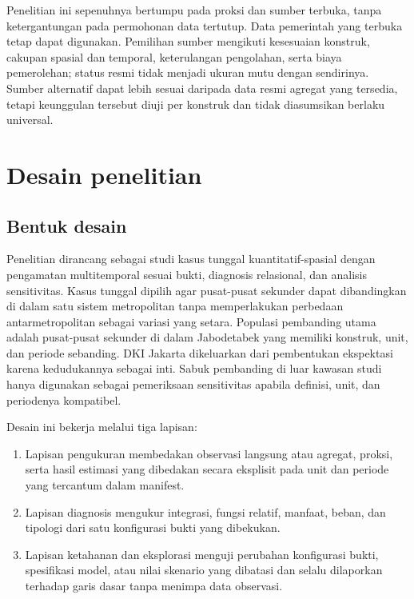 \documentclass[11pt,a4paper,oneside,openany,indonesian]{report}
\begin{document}
Penelitian ini sepenuhnya bertumpu pada proksi dan sumber terbuka, tanpa
ketergantungan pada permohonan data tertutup. Data pemerintah yang
terbuka tetap dapat digunakan. Pemilihan sumber mengikuti kesesuaian
konstruk, cakupan spasial dan temporal, keterulangan pengolahan, serta
biaya pemerolehan; status resmi tidak menjadi ukuran mutu dengan
sendirinya. Sumber alternatif dapat lebih sesuai daripada data resmi
agregat yang tersedia, tetapi keunggulan tersebut diuji per konstruk dan
tidak diasumsikan berlaku universal.

\section{Desain penelitian}\label{desain-penelitian}

\subsection{Bentuk desain}\label{bentuk-desain}

Penelitian dirancang sebagai studi kasus tunggal kuantitatif-spasial
dengan pengamatan multitemporal sesuai bukti, diagnosis relasional, dan
analisis sensitivitas. Kasus tunggal dipilih agar pusat-pusat sekunder
dapat dibandingkan di dalam satu sistem metropolitan tanpa memperlakukan
perbedaan antarmetropolitan sebagai variasi yang setara. Populasi
pembanding utama adalah pusat-pusat sekunder di dalam Jabodetabek yang
memiliki konstruk, unit, dan periode sebanding. DKI Jakarta dikeluarkan
dari pembentukan ekspektasi karena kedudukannya sebagai inti. Sabuk
pembanding di luar kawasan studi hanya digunakan sebagai pemeriksaan
sensitivitas apabila definisi, unit, dan periodenya kompatibel.

Desain ini bekerja melalui tiga lapisan:

\begin{enumerate}
\def\labelenumi{\arabic{enumi}.}
\tightlist
\item
  Lapisan pengukuran membedakan observasi langsung atau agregat, proksi,
  serta hasil estimasi yang dibedakan secara eksplisit pada unit dan
  periode yang tercantum dalam manifest.
\item
  Lapisan diagnosis mengukur integrasi, fungsi relatif,
  manfaat, beban, dan tipologi dari satu konfigurasi bukti yang
  dibekukan.
\item
  Lapisan ketahanan dan eksplorasi menguji perubahan konfigurasi
  bukti, spesifikasi model, atau nilai skenario yang dibatasi dan selalu
  dilaporkan terhadap garis dasar tanpa menimpa data observasi.
\end{enumerate}
\end{document}
